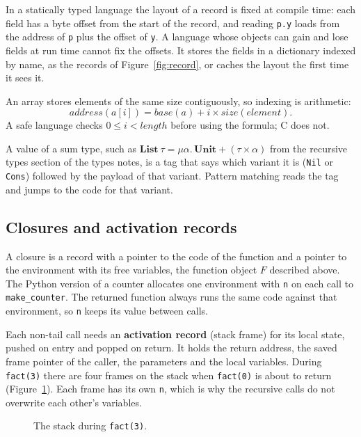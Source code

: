 In a statically typed language the layout of a record is fixed at compile
time: each field has a byte offset from the start of the record, and reading
\texttt{p.y} loads from the address of \texttt{p} plus the offset of
\texttt{y}.
A language whose objects can gain and lose fields at run time cannot fix the
offsets. It stores the fields in a dictionary indexed by name, as the records
of Figure~\ref{fig:record}, or caches the layout the first time it sees it.

An array stores elements of the same size contiguously, so indexing is
arithmetic:
\[
  \mathit{address}(a[i]) = \mathit{base}(a) + i \times \mathit{size}(\mathit{element}).
\]
A safe language checks $0 \le i < \mathit{length}$ before using the formula;
C does not.

A value of a sum type, such as $\mathbf{List}\ \tau = \mu\alpha.\, \mathbf{Unit} +
(\tau \times \alpha)$ from the recursive types section of the types notes,
is a tag that says which variant it is (\texttt{Nil} or \texttt{Cons})
followed by the payload of that variant. Pattern matching reads the tag and
jumps to the code for that variant.

\subsection{Closures and activation records}

A closure is a record with a pointer to the code of the function and a
pointer to the environment with its free variables, the function object $F$
described above. The Python version of a counter
allocates one environment with \texttt{n} on each call to
\texttt{make\_counter}. The returned function always runs the same code
against that environment, so \texttt{n} keeps its value between calls.

Each non-tail call needs an \textbf{activation record} (stack frame) for its
local state, pushed on entry and popped on return. It holds the return
address, the saved frame pointer of the caller, the parameters and the local
variables. During \texttt{fact(3)}
there are four frames on the stack when \texttt{fact(0)} is about to return
(Figure~\ref{fig:frames}). Each frame has its own \texttt{n}, which is why the
recursive calls do not overwrite each other's variables.

\begin{figure}[h]
\centering
{}
\caption{The stack during \texttt{fact(3)}.}
\label{fig:frames}
\end{figure}

